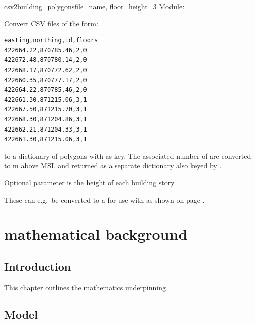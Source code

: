 \documentclass{manual}
\begin{document}
\begin{funcdesc}{csv2building\_polygons}{file\_name, floor\_height=3}
  Module: 

  Convert CSV files of the form:

  \begin{verbatim} 
easting,northing,id,floors
422664.22,870785.46,2,0
422672.48,870780.14,2,0
422668.17,870772.62,2,0
422660.35,870777.17,2,0
422664.22,870785.46,2,0
422661.30,871215.06,3,1
422667.50,871215.70,3,1
422668.30,871204.86,3,1
422662.21,871204.33,3,1
422661.30,871215.06,3,1
  \end{verbatim}

  to a dictionary of polygons with  as key.
  The associated number of  are converted to m above MSL and 
  returned as a separate dictionary also keyed by .
    
  Optional parameter  is the height of each building story.

  These can e.g.\ be converted to a  for use with 
  as shown on page \pageref{add quantity}.
\end{funcdesc}


\chapter{\anuga mathematical background}
\label{cd:mathematical background}


\section{Introduction}

This chapter outlines the mathematics underpinning \anuga.


\section{Model}
\label{sec:model}
\end{document}
